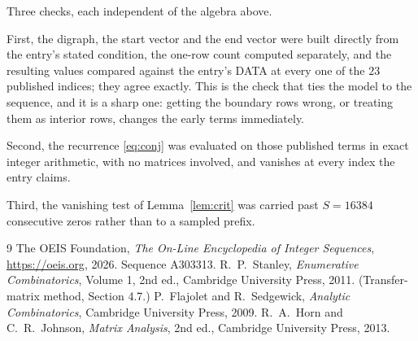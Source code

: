 \documentclass[11pt,a4paper]{article}
\theoremstyle{plain}
\theoremstyle{definition}
\begin{document}
Three checks, each independent of the algebra above.

First, the digraph, the start vector and the end vector were built directly from the
entry's stated condition, the one-row count computed separately, and the resulting values
compared against the entry's DATA at every one of the $23$ published indices; they
agree exactly. This is the check that ties the model to the sequence, and it is a sharp one:
getting the boundary rows wrong, or treating them as interior rows, changes the early terms
immediately.

Second, the recurrence \eqref{eq:conj} was evaluated on those published terms in exact
integer arithmetic, with no matrices involved, and vanishes at every index the entry claims.

Third, the vanishing test of Lemma~\ref{lem:crit} was carried past $S=16384$ consecutive
zeros rather than to a sampled prefix.

\begin{thebibliography}{9}
 The OEIS Foundation, \emph{The On-Line Encyclopedia of Integer
Sequences}, \url{https://oeis.org}, 2026. Sequence A303313.
 R.~P.~Stanley, \emph{Enumerative Combinatorics}, Volume 1, 2nd ed.,
Cambridge University Press, 2011. (Transfer-matrix method, Section 4.7.)
 P.~Flajolet and R.~Sedgewick, \emph{Analytic Combinatorics}, Cambridge
University Press, 2009.
 R.~A.~Horn and C.~R.~Johnson, \emph{Matrix Analysis}, 2nd ed., Cambridge
University Press, 2013.
\end{thebibliography}
\end{document}
